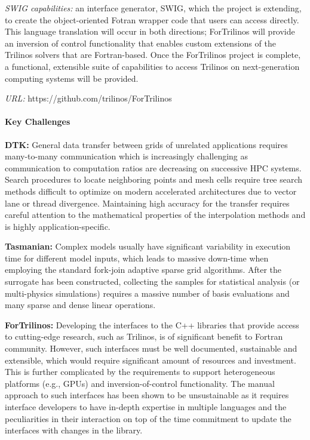 {\it SWIG capabilities:}  an interface generator, SWIG, which the project is
extending, to create the object-oriented Fotran wrapper code that users can
access directly. This language translation will occur in both directions;
ForTrilinos will provide an inversion of control functionality that enables
custom extensions of the Trilinos solvers that are Fortran-based. Once the
ForTrilinos project is complete, a functional, extensible suite of capabilities
to access Trilinos on next-generation computing systems will be provided.

{\it URL:} https://github.com/trilinos/ForTrilinos

\paragraph{Key Challenges}

\indent

{\bf DTK:} General data transfer between grids of unrelated applications
requires many-to-many communication which is increasingly challenging as
communication to computation ratios are decreasing on successive HPC systems.
Search procedures to locate neighboring points and mesh cells require tree
search methods difficult to optimize on modern accelerated architectures due
to vector lane or thread divergence. Maintaining high accuracy for the
transfer requires careful attention to the mathematical properties of the
interpolation methods and is highly application-specific.

{\bf Tasmanian:} Complex models usually have significant variability in
execution time for different model inputs, which leads to massive down-time
when employing the standard fork-join adaptive sparse grid algorithms.  After
the surrogate has been constructed, collecting the samples for statistical
analysis (or multi-physics simulations) requires a massive number of basis
evaluations and many sparse and dense linear operations.

{\bf ForTrilinos:} Developing the interfaces to the C++ libraries that provide
access to cutting-edge research, such as Trilinos,  is of significant benefit
to Fortran community. However, such interfaces must be well documented,
sustainable and extensible, which would require significant amount of resources
and investment. This is further complicated by the requirements to support
heterogeneous platforms (e.g., GPUs) and inversion-of-control functionality.
The manual approach to such interfaces has been shown to be unsustainable as it
requires interface developers to have in-depth expertise in  multiple languages
and the peculiarities in their interaction on top of the time commitment to
update the interfaces with changes in the library.

